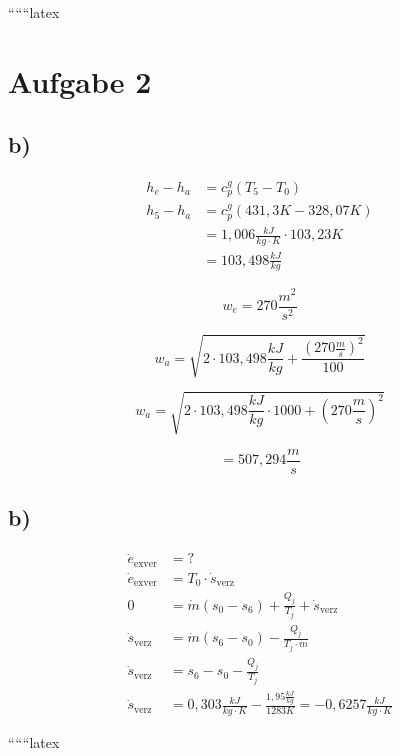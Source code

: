 ``````latex


\section*{Aufgabe 2}



\subsection*{b)}

\begin{align*}
h_e - h_a &= c_p^g (T_5 - T_0) \\
h_5 - h_a &= c_p^g (431,3K - 328,07K) \\
&= 1,006 \frac{kJ}{kg \cdot K} \cdot 103,23K \\
&= 103,498 \frac{kJ}{kg}
\end{align*}

\[
w_e = 270 \frac{m^2}{s^2}
\]

\[
w_a = \sqrt{2 \cdot 103,498 \frac{kJ}{kg} + \frac{(270 \frac{m}{s})^2}{100}}
\]

\[
w_a = \sqrt{2 \cdot 103,498 \frac{kJ}{kg} \cdot 1000 + (270 \frac{m}{s})^2}
\]

\[
= 507,294 \frac{m}{s}
\]



\subsection*{b)}
\begin{align*}
\dot{e}_{\text{exver}} &= ? \\
\dot{e}_{\text{exver}} &= T_0 \cdot \dot{s}_{\text{verz}} \\
0 &= \dot{m} \left( s_0 - s_6 \right) + \frac{Q_j}{T_j} + \dot{s}_{\text{verz}} \\
\dot{s}_{\text{verz}} &= \dot{m} \left( s_6 - s_0 \right) - \frac{Q_j}{T_j \cdot \dot{m}} \\
\dot{s}_{\text{verz}} &= s_6 - s_0 - \frac{Q_j}{T_j} \\
\dot{s}_{\text{verz}} &= 0,303 \frac{kJ}{kg \cdot K} - \frac{1,95 \frac{kJ}{kg}}{1283 K} = -0,6257 \frac{kJ}{kg \cdot K}
\end{align*}

``````latex